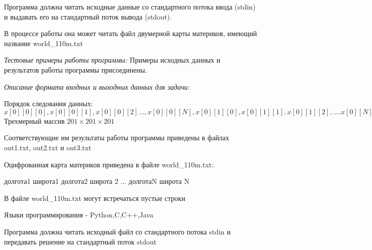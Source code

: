     Программа должна читать исходные данные со стандартного потока ввода (stdin) и выдавать его на стандартный поток вывода (stdout).
    
В процессе работы она может читать файл двумерной карты материков, имеющий название world\_110m.txt 

\textit{Тестовые примеры работы программы:}
	Примеры исходных данных и результатов работы программы присоединены.

\textit{Описание формата входных и выходных данных для задачи:}

Порядок следования данных: $x[0][0][0], x[0][0][1], x[0][0][2]...,x[0][0][N],x[0][1][0],x[0][1][1], x[0][1][2], .... x[0][N][N],x[1][0][0],x[1][0][1],...,x[N][N][N].$ Трехмерный массив $201\times 201\times 201$

Соответствующие им результаты работы программы приведены в файлах out1.txt, out2.txt и out3.txt

Оцифрованная карта материков приведена в файле world\_110m.txt:

долгота1 широта1
долгота2 широта 2
...
долготаN широта N

В файле world\_110m.txt могут встречаться пустые строки

Языки программирования - Python,C,C++,Java

Программа должна читать исходный файл со стандартного потока stdin и передавать решение на стандартный поток stdout

\explanationSection


